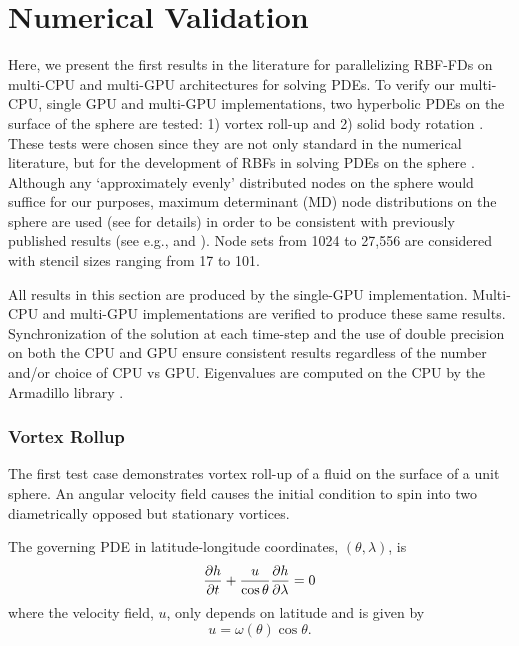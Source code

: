 
\chapter{Numerical Validation} 

\label{sec:validation}

Here, we present the first results in the literature for parallelizing RBF-FDs on multi-CPU and multi-GPU architectures for solving PDEs. 
 To verify our multi-CPU, single GPU and multi-GPU implementations, two hyperbolic PDEs on the surface of the sphere are tested: 1) vortex roll-up \cite{NairTransport05, NairJablonowski08} and 2) solid body rotation \cite{JakobChien1995}. These tests were chosen since they are not only standard in the numerical literature, but 
for the development of RBFs in solving PDEs on the sphere \cite{FlyerWright07, Fornberg2008, FlyerLehto10, Fornberg2011a}. Although any `approximately evenly' distributed nodes on the sphere would suffice for our purposes, maximum determinant (MD) node distributions on the sphere are used (see \cite{Sloan2003} for details) in order to be consistent with previously published results (see e.g., \cite{FlyerWright07} and \cite{FornbergLehto11}). Node sets from 1024 to 27,556 are considered with stencil sizes ranging from 17 to 101.

All results in this section are produced by the single-GPU implementation. Multi-CPU and multi-GPU implementations are verified to produce these same results. Synchronization of the solution at each time-step and the use of double precision on both the CPU and GPU ensure consistent results regardless of the number and/or choice of CPU vs GPU. Eigenvalues are computed on the CPU by the Armadillo library . 


\subsection{Vortex Rollup}
\label{sec:numerical_validation}
The first test case demonstrates vortex roll-up of a fluid on the surface of a unit sphere. An angular velocity field causes the initial condition to spin into two diametrically opposed but stationary vortices.

The governing PDE in latitude-longitude coordinates, $(\theta,\lambda)$, is
\begin{equation}
\frac{\partial h}{\partial t} + \frac{u}{\cos \theta} \frac{\partial h}{\partial \lambda} = 0
\label{eq:vortex}
\end{equation}
where the velocity field, $u$, only depends on latitude and is given by
\begin{equation*}
u  = \omega(\theta) \cos \theta.
\end{equation*}

